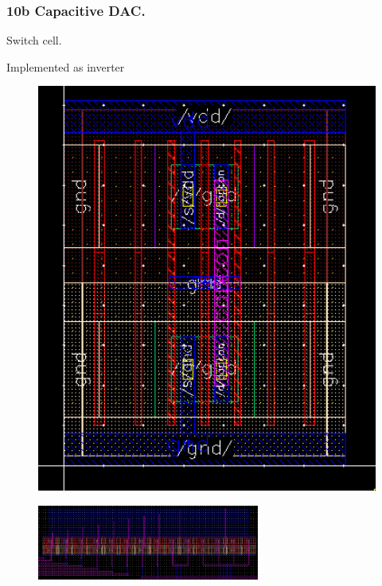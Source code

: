 \documentclass[t, screen, aspectratio=43]{beamer}
\begin{document}
\begin{frame}
	\frametitle{10b Capacitive DAC.}
	\begin{block}{Switch cell.}
		\begin{minipage}{4cm}
			\vspace{1em}
			\tiny Implemented as inverter
			\begin{figure}[htb!]
			        \centering
			        \includegraphics[width=1\textwidth, angle=0]{cdac_switch}
			\end{figure}
		\end{minipage}%
		\begin{minipage}{8cm}
			\begin{figure}[htb!]
			        \centering
			        \includegraphics[width=0.65\textwidth, angle=0]{cdac_switches}
			\end{figure}
		\end{minipage}%

	\end{block}	
\end{frame}
\end{document}
